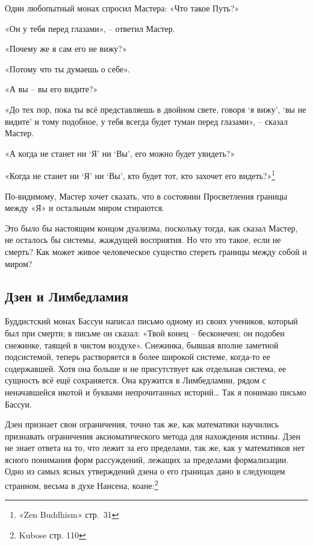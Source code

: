 \documentclass[../main.tex]{subfiles}
\begin{document}
\begin{koan}
    Один любопытный монах спросил Мастера: «Что такое Путь?»

    «Он у тебя перед глазами», \--- ответил Мастер.

    «Почему же я сам его не вижу?»

    «Потому что ты думаешь о себе».

    «А вы \--- вы его видите?»

    «До тех пор, пока ты всё представляешь в двойном свете, говоря \enquote*{я вижу}, \enquote*{вы не видите} и тому подобное, у тебя всегда будет туман перед глазами», \--- сказал Мастер.

    «А когда не станет ни \enquote*{Я} ни \enquote*{Вы}, его можно будет увидеть?»

    «Когда не станет ни \enquote*{Я} ни \enquote*{Вы}, кто будет тот, кто захочет его видеть?»\footnote{«Zen Buddhism» стр.~31}
\end{koan}

По-видимому, Мастер хочет сказать, что в состоянии Просветления границы между «Я» и остальным миром стираются.

Это было бы настоящим концом дуализма, поскольку тогда, как сказал Мастер, не осталось бы системы, жаждущей восприятия. Но что это такое, если не смерть? Как может живое человеческое существо стереть границы между собой и миром?


\subsection{Дзен и Лимбедламия}

Буддистский монах Бассуи написал письмо одному из своих учеников, который был при смерти; в письме он сказал: «Твой конец \--- бесконечен; он подобен снежинке, таящей в чистом воздухе». Снежинка, бывшая вполне заметной подсистемой, теперь растворяется в более широкой системе, когда-то ее содержавшей. Хотя она больше и не присутствует как отдельная система, ее сущность всё ещё сохраняется. Она кружится в Лимбедламии, рядом с неначавшейся икотой и буквами непрочитанных историй\ldots{} Так я понимаю письмо Бассуи.

Дзен признает свои ограничения, точно так же, как математики научились признавать ограничения аксиоматического метода для нахождения истины. Дзен не знает ответа на то, что лежит за его пределами, так же, как у математиков нет ясного понимания форм рассуждений, лежащих за пределами формализации. Одно из самых ясных утверждений дзена о его границах дано в следующем странном, весьма в духе Нансена, коане:\footnote{Kubose стр. 110}
\end{document}
